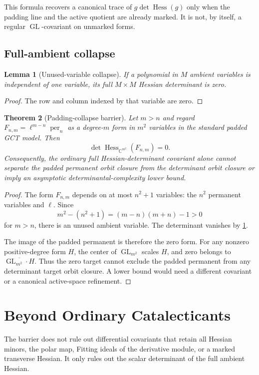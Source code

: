 \documentclass[11pt]{article}
\newtheorem{theorem}{Theorem}[section]
\newtheorem{lemma}[theorem]{Lemma}
\theoremstyle{definition}
\theoremstyle{remark}
\DeclareMathOperator{\Hess}{Hess}
\DeclareMathOperator{\per}{per}
\newcommand{\C}{\mathbb C}
\newcommand{\GL}{\operatorname{GL}}
\begin{document}
This formula recovers a canonical trace of $g\det\Hess(g)$ only when the padding
line and the active quotient are already marked.  It is not, by itself, a
regular $\GL$-covariant on unmarked forms.

\subsection{Full-ambient collapse}

\begin{lemma}[Unused-variable collapse]\label{lem:unused}
If a polynomial in $M$ ambient variables is independent of one variable, its
full $M\times M$ Hessian determinant is zero.
\end{lemma}
\begin{proof}
The row and column indexed by that variable are zero.
\end{proof}

\begin{theorem}[Padding-collapse barrier]\label{thm:collapse}
Let $m>n$ and regard
$F_{n,m}=\ell^{m-n}\per_n$ as a degree-$m$ form in $m^2$ variables in the
standard padded GCT model.  Then
\[
\det\Hess_{\C^{m^2}}(F_{n,m})=0.
\]
Consequently, the ordinary full Hessian-determinant covariant alone cannot
separate the padded permanent orbit closure from the determinant orbit closure
or imply an asymptotic determinantal-complexity lower bound.
\end{theorem}
\begin{proof}
The form $F_{n,m}$ depends on at most $n^2+1$ variables: the $n^2$ permanent
variables and $\ell$.  Since
\[
m^2-(n^2+1)=(m-n)(m+n)-1>0
\]
for $m>n$, there is an unused ambient variable.  The determinant vanishes by
\cref{lem:unused}.

The image of the padded permanent is therefore the zero form.  For any nonzero
positive-degree form $H$, the center of $\GL_{m^2}$ scales $H$, and zero belongs
to $\overline{\GL_{m^2}\cdot H}$.  Thus the zero target cannot exclude the
padded permanent from any determinant target orbit closure.  A lower bound
would need a different covariant or a canonical active-space refinement.
\end{proof}

\section{Beyond Ordinary Catalecticants}

The barrier does not rule out differential covariants that retain all Hessian
minors, the polar map, Fitting ideals of the derivative module, or a marked
transverse Hessian.  It only rules out the scalar determinant of the full
ambient Hessian.
\end{document}
